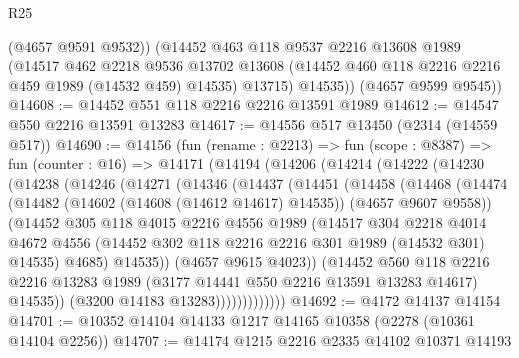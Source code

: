 \begin{lexlean}{R25}
\begin{coremodule}
          (@4657 @9591 @9532))
        (@14452
          @463
          @118
          @9537
          @2216
          @13608
          @1989
          (@14517
            @462
            @2218
            @9536
            @13702
            @13608
            (@14452 @460 @118 @2216 @2216 @459 @1989 (@14532 @459) @14535)
            @13715)
          @14535))
      (@4657 @9599 @9545))
@14608 := @14452 @551 @118 @2216 @2216 @13591 @1989
@14612 := @14547 @550 @2216 @13591 @13283
@14617 := @14556 @517 @13450 (@2314 (@14559 @517))
@14690 := @14156
    (fun (rename : @2213) =>
    fun (scope : @8387) =>
    fun (counter : @16) =>
    @14171
      (@14194
        (@14206
          (@14214
            (@14222
              (@14230
                (@14238
                  (@14246
                    (@14271
                      (@14346
                        (@14437
                          (@14451
                            (@14458
                              (@14468
                                (@14474
                                  (@14482
                                    (@14602 (@14608 (@14612 @14617) @14535))
                                    (@4657 @9607 @9558))
                                  (@14452
                                    @305
                                    @118
                                    @4015
                                    @2216
                                    @4556
                                    @1989
                                    (@14517
                                      @304
                                      @2218
                                      @4014
                                      @4672
                                      @4556
                                      (@14452 @302 @118 @2216 @2216 @301 @1989 (@14532 @301) @14535)
                                      @4685)
                                    @14535))
                                (@4657 @9615 @4023))
                              (@14452
                                @560
                                @118
                                @2216
                                @2216
                                @13283
                                @1989
                                (@3177 @14441 @550 @2216 @13591 @13283 @14617)
                                @14535))
                            (@3200 @14183 @13283)))))))))))))
@14692 := @4172 @14137 @14154
@14701 := @10352 @14104 @14133 @1217 @14165 @10358 (@2278 (@10361 @14104 @2256))
@14707 := @14174 @1215 @2216 @2335 @14102 @10371 @14193

\end{coremodule}
\end{lexlean}
